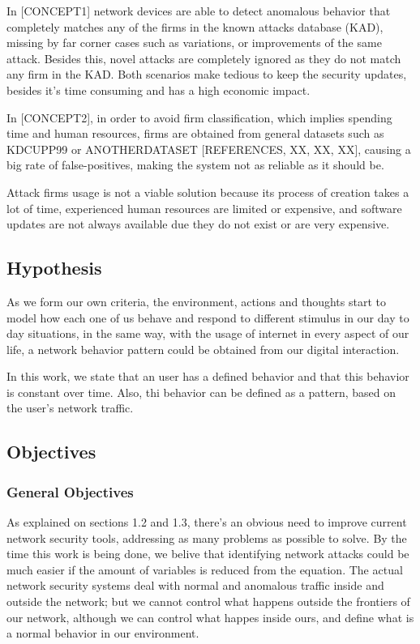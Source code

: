 \documentclass{article}
\begin{document}
In [CONCEPT1] network devices are able to detect anomalous behavior that completely matches any of the firms in the known attacks database (KAD), missing by far corner cases such as variations, or improvements of the same attack. Besides this, novel attacks are completely ignored as they do not match any firm in the KAD. Both scenarios make tedious to keep the security updates, besides it's time consuming and has a high economic impact.

In [CONCEPT2], in order to avoid firm classification, which implies spending time and human resources, firms are obtained from general datasets such as KDCUPP99 or ANOTHERDATASET [REFERENCES, XX, XX, XX], causing a big rate of false-positives, making the system not as reliable as it should be.

Attack firms usage is not a viable solution because its process of creation takes a lot of time, experienced human resources are limited or expensive, and software updates are not always available due they do not exist or are very expensive.




\subsection{Hypothesis} %
As we form our own criteria, the environment, actions and thoughts start to model how each one of us behave and respond to different stimulus in our day to day situations, in the same way, with the usage of internet in every aspect of our life, a network behavior pattern could be obtained from our digital interaction.



In this work, we state that an user has a defined behavior and that this behavior is constant over time. Also, thi behavior can be defined as a pattern, based on the user's network traffic.




\subsection{Objectives} %
\subsubsection{General Objectives} %
As explained on sections 1.2 and 1.3, there's an obvious need to improve current network security tools, addressing as many problems as possible to solve. By the time this work is being done, we belive that identifying network attacks could be much easier if the amount of variables is reduced from the equation. The actual network security systems deal with normal and anomalous traffic inside and outside the network; but we cannot control what happens outside the frontiers of our network, although we can control what happes inside ours, and define what is a normal behavior in our environment.
\end{document}

